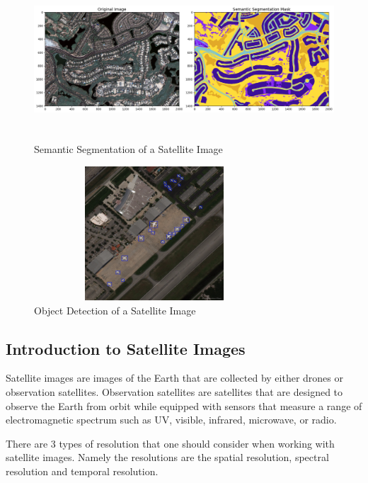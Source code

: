 \begin{figure}[ht]
\includegraphics[width=12cm, height=6cm]{images/semantic segmentation example.jpg}
\centering
\caption{Semantic Segmentation of a Satellite Image}
\label{fig:example of semantic segmentation}
\end{figure}

\begin{figure}[ht]
\includegraphics[width=9cm, height=5cm]{images/airport object detection.jpeg}
\centering
\caption{Object Detection of a Satellite Image}
\label{fig:airport object detection}
\end{figure}

\subsection{Introduction to Satellite Images}

Satellite images are images of the Earth that are collected by either drones or observation satellites. Observation satellites are satellites that are designed to observe the Earth from orbit while equipped with sensors that measure a range of  electromagnetic spectrum such as UV, visible, infrared, microwave, or radio. 

There are 3 types of resolution that one should consider when working with satellite images. Namely the resolutions are the spatial resolution, spectral resolution and temporal resolution.

